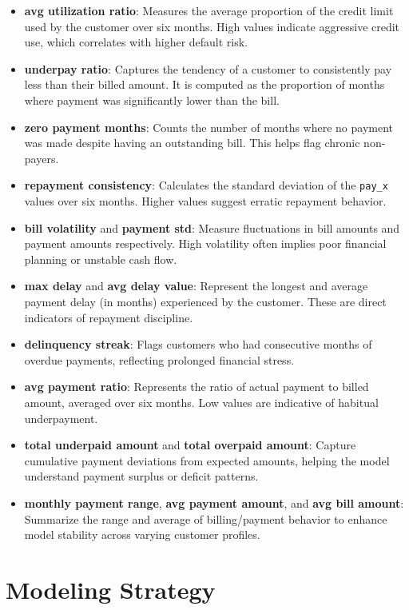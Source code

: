 \documentclass[12pt,a4paper]{article}
\begin{document}
\begin{itemize}
    \item \textbf{avg utilization ratio}: Measures the average proportion of the credit limit used by the customer over six months. High values indicate aggressive credit use, which correlates with higher default risk.
    \item \textbf{underpay ratio}: Captures the tendency of a customer to consistently pay less than their billed amount. It is computed as the proportion of months where payment was significantly lower than the bill.
    \item \textbf{zero payment months}: Counts the number of months where no payment was made despite having an outstanding bill. This helps flag chronic non-payers.
    \item \textbf{repayment consistency}: Calculates the standard deviation of the \texttt{pay\_x} values over six months. Higher values suggest erratic repayment behavior.
    \item \textbf{bill volatility} and \textbf{payment std}: Measure fluctuations in bill amounts and payment amounts respectively. High volatility often implies poor financial planning or unstable cash flow.
    \item \textbf{max delay} and \textbf{avg delay value}: Represent the longest and average payment delay (in months) experienced by the customer. These are direct indicators of repayment discipline.
    \item \textbf{delinquency streak}: Flags customers who had consecutive months of overdue payments, reflecting prolonged financial stress.
    \item \textbf{avg payment ratio}: Represents the ratio of actual payment to billed amount, averaged over six months. Low values are indicative of habitual underpayment.
    \item \textbf{total underpaid amount} and \textbf{total overpaid amount}: Capture cumulative payment deviations from expected amounts, helping the model understand payment surplus or deficit patterns.
    \item \textbf{monthly payment range}, \textbf{avg payment amount}, and \textbf{avg bill amount}: Summarize the range and average of billing/payment behavior to enhance model stability across varying customer profiles.
\end{itemize}

\section{Modeling Strategy}
\end{document}

